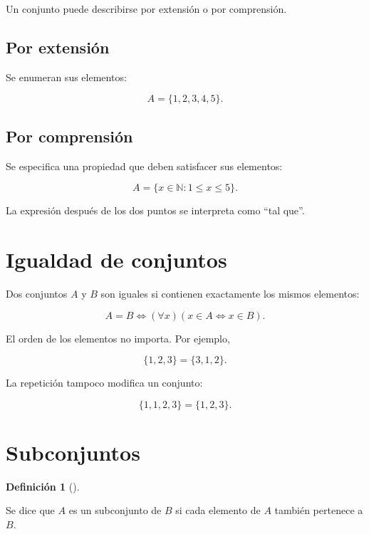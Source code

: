 \documentclass[
  spanish,
  10.5pt,
  letterpaper,
  DIV=11,
  numbers=noendperiod,
  oneside,
  open=any]{scrreprt}
\theoremstyle{definition}
\newtheorem{definition}{Definición}[chapter]
\theoremstyle{definition}
\theoremstyle{plain}
\theoremstyle{remark}
\begin{document}

Un conjunto puede describirse por extensión o por comprensión.

\subsection*{Por extensión}\label{por-extensiuxf3n}

Se enumeran sus elementos:

\[
A=\{1,2,3,4,5\}.
\]

\subsection*{Por comprensión}\label{por-comprensiuxf3n}

Se especifica una propiedad que deben satisfacer sus elementos:

\[
A=\{x\in\mathbb{N}:1\leq x\leq 5\}.
\]

La expresión después de los dos puntos se interpreta como ``tal que''.

\section*{Igualdad de conjuntos}\label{igualdad-de-conjuntos}


Dos conjuntos \(A\) y \(B\) son iguales si contienen exactamente los
mismos elementos:

\[
A=B
\iff
(\forall x)(x\in A\Leftrightarrow x\in B).
\]

El orden de los elementos no importa. Por ejemplo,

\[
\{1,2,3\}=\{3,1,2\}.
\]

La repetición tampoco modifica un conjunto:

\[
\{1,1,2,3\}=\{1,2,3\}.
\]

\section*{Subconjuntos}\label{subconjuntos}


\begin{definition}[]\protect\hypertarget{def-subconjunto}{}\label{def-subconjunto}

Se dice que \(A\) es un subconjunto de \(B\) si cada elemento de \(A\)
también pertenece a \(B\).

\end{definition}
\end{document}
